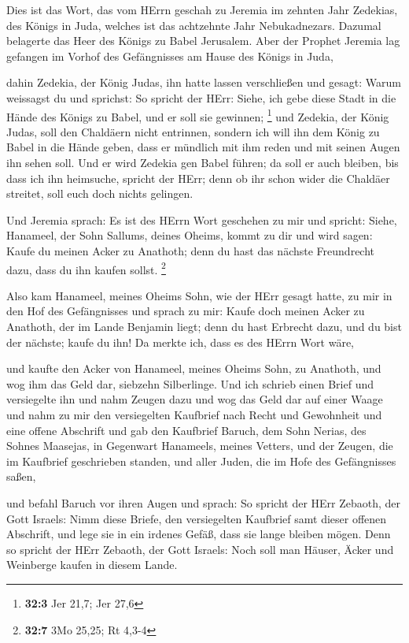  Dies ist das Wort, das vom HErrn geschah zu Jeremia im
zehnten Jahr Zedekias, des Königs in Juda, welches ist das achtzehnte
Jahr Nebukadnezars.  Dazumal belagerte das Heer des Königs
zu Babel Jerusalem. Aber der Prophet Jeremia lag gefangen im Vorhof des
Gefängnisses am Hause des Königs in Juda,

 dahin Zedekia, der König Judas, ihn hatte lassen
verschließen und gesagt: Warum weissagst du und sprichst: So spricht der
HErr: Siehe, ich gebe diese Stadt in die Hände des Königs zu Babel, und
er soll sie gewinnen; \footnote{\textbf{32:3} Jer 21,7; Jer 27,6}
 und Zedekia, der König Judas, soll den Chaldäern nicht
entrinnen, sondern ich will ihn dem König zu Babel in die Hände geben,
dass er mündlich mit ihm reden und mit seinen Augen ihn sehen soll.
 Und er wird Zedekia gen Babel führen; da soll er auch
bleiben, bis dass ich ihn heimsuche, spricht der HErr; denn ob ihr schon
wider die Chaldäer streitet, soll euch doch nichts gelingen.

 Und Jeremia sprach: Es ist des HErrn Wort geschehen zu
mir und spricht:  Siehe, Hanameel, der Sohn Sallums,
deines Oheims, kommt zu dir und wird sagen: Kaufe du meinen Acker zu
Anathoth; denn du hast das nächste Freundrecht dazu, dass du ihn kaufen
sollst. \footnote{\textbf{32:7} 3Mo 25,25; Rt 4,3-4}

 Also kam Hanameel, meines Oheims Sohn, wie der HErr
gesagt hatte, zu mir in den Hof des Gefängnisses und sprach zu mir:
Kaufe doch meinen Acker zu Anathoth, der im Lande Benjamin liegt; denn
du hast Erbrecht dazu, und du bist der nächste; kaufe du ihn! Da merkte
ich, dass es des HErrn Wort wäre,

 und kaufte den Acker von Hanameel, meines Oheims Sohn, zu
Anathoth, und wog ihm das Geld dar, siebzehn Silberlinge.
 Und ich schrieb einen Brief und versiegelte ihn und nahm
Zeugen dazu und wog das Geld dar auf einer Waage  und
nahm zu mir den versiegelten Kaufbrief nach Recht und Gewohnheit und
eine offene Abschrift  und gab den Kaufbrief Baruch, dem
Sohn Nerias, des Sohnes Maasejas, in Gegenwart Hanameels, meines
Vetters, und der Zeugen, die im Kaufbrief geschrieben standen, und aller
Juden, die im Hofe des Gefängnisses saßen,

 und befahl Baruch vor ihren Augen und sprach:
 So spricht der HErr Zebaoth, der Gott Israels: Nimm
diese Briefe, den versiegelten Kaufbrief samt dieser offenen Abschrift,
und lege sie in ein irdenes Gefäß, dass sie lange bleiben mögen.
 Denn so spricht der HErr Zebaoth, der Gott Israels: Noch
soll man Häuser, Äcker und Weinberge kaufen in diesem Lande.

